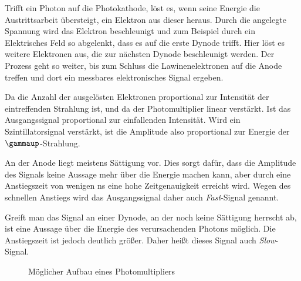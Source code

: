 Trifft ein Photon auf die Photokathode, löst es, wenn seine Energie die
Austrittsarbeit übersteigt, ein Elektron aus dieser heraus. Durch die angelegte
Spannung wird das Elektron beschleunigt und zum Beispiel durch ein Elektrisches
Feld so abgelenkt, dass es auf die erste Dynode trifft. Hier löst es weitere
Elektronen aus, die zur nächsten Dynode beschleunigt werden. Der Prozess geht
so weiter, bis zum Schluss die Lawinenelektronen auf die Anode treffen und dort
ein messbares elektronisches Signal ergeben.

Da die Anzahl der ausgelösten Elektronen proportional zur Intensität der
eintreffenden Strahlung ist, und da der Photomultiplier linear verstärkt. Ist
das Ausgangssignal proportional zur einfallenden Intensität. Wird ein
Szintillatorsignal verstärkt, ist die Amplitude also proportional zur Energie
der $\gammaup$-Strahlung.

An der Anode liegt meistens Sättigung vor. Dies sorgt dafür, dass die Amplitude
des Signals keine Aussage mehr über die Energie machen kann, aber durch eine
Anstiegszeit von wenigen \si{\nano\second} eine hohe Zeitgenauigkeit erreicht
wird. Wegen des schnellen Anstiegs wird das Ausgangssignal daher auch
\emph{Fast}-Signal genannt.

Greift man das Signal an einer Dynode, an der noch keine Sättigung herrscht ab,
ist eine Aussage über die Energie des verursachenden Photons möglich. Die
Anstiegszeit ist jedoch deutlich größer. Daher heißt dieses Signal auch
\emph{Slow}-Signal.

\begin{figure}[htbp]
    \centering
    \caption{%
        Möglicher Aufbau eines Photomultipliers
    }
    \label{fig:PM}
\end{figure}


